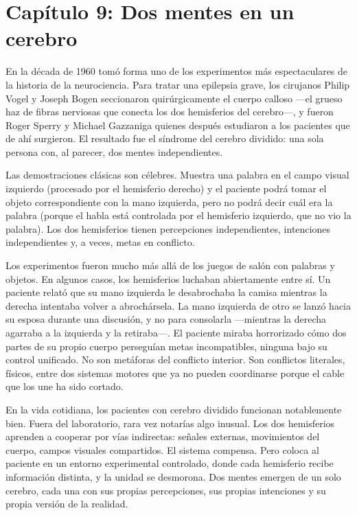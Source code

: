\documentclass[11pt, twoside, openright]{book}
\begin{document}
\chapter*{Capítulo 9: Dos mentes en un cerebro}

En la década de 1960 tomó forma uno de los experimentos más espectaculares de la historia de la neurociencia. Para tratar una epilepsia grave, los cirujanos Philip Vogel y Joseph Bogen seccionaron quirúrgicamente el cuerpo calloso ---el grueso haz de fibras nerviosas que conecta los dos hemisferios del cerebro---, y fueron Roger Sperry y Michael Gazzaniga quienes después estudiaron a los pacientes que de ahí surgieron. El resultado fue el síndrome del cerebro dividido: una sola persona con, al parecer, dos mentes independientes.

Las demostraciones clásicas son célebres. Muestra una palabra en el campo visual izquierdo (procesado por el hemisferio derecho) y el paciente podrá tomar el objeto correspondiente con la mano izquierda, pero no podrá decir cuál era la palabra (porque el habla está controlada por el hemisferio izquierdo, que no vio la palabra). Los dos hemisferios tienen percepciones independientes, intenciones independientes y, a veces, metas en conflicto.

Los experimentos fueron mucho más allá de los juegos de salón con palabras y objetos. En algunos casos, los hemisferios luchaban abiertamente entre sí. Un paciente relató que su mano izquierda le desabrochaba la camisa mientras la derecha intentaba volver a abrochársela. La mano izquierda de otro se lanzó hacia su esposa durante una discusión, y no para consolarla ---mientras la derecha agarraba a la izquierda y la retiraba---. El paciente miraba horrorizado cómo dos partes de su propio cuerpo perseguían metas incompatibles, ninguna bajo su control unificado. No son metáforas del conflicto interior. Son conflictos literales, físicos, entre dos sistemas motores que ya no pueden coordinarse porque el cable que los une ha sido cortado.

En la vida cotidiana, los pacientes con cerebro dividido funcionan notablemente bien. Fuera del laboratorio, rara vez notarías algo inusual. Los dos hemisferios aprenden a cooperar por vías indirectas: señales externas, movimientos del cuerpo, campos visuales compartidos. El sistema compensa. Pero coloca al paciente en un entorno experimental controlado, donde cada hemisferio recibe información distinta, y la unidad se desmorona. Dos mentes emergen de un solo cerebro, cada una con sus propias percepciones, sus propias intenciones y su propia versión de la realidad.
\end{document}

